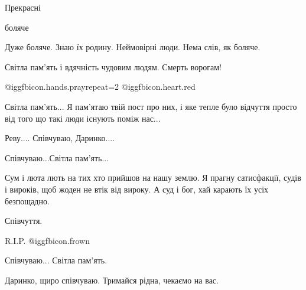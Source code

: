  
 
 
 
 
\zzSecCmt

\begin{itemize} %
Прекрасні

боляче

Дуже боляче. Знаю їх родину. Неймовірні люди. Нема слів, як боляче.

Світла пам'ять і вдячність чудовим людям.
Смерть ворогам!

 @igg{fbicon.hands.pray}{repeat=2} @igg{fbicon.heart.red}

Світла пам'ять...
Я пам'ятаю твій пост про них, і яке тепле було відчуття просто від того що такі люди існують поміж нас...

Реву....
Співчуваю, Даринко....

Співчуваю...Світла пам'ять...


Сум і люта лють на тих хто прийшов на нашу землю. Я прагну сатисфакції, судів і
вироків, щоб жоден не втік від вироку. А суд і бог, хай карають їх усіх
безпощадно.

Співчуття.

R.I.P.  @igg{fbicon.frown} 

Співчуваю... Світла пам'ять.

Даринко, щиро співчуваю. Тримайся рідна, чекаємо на вас.

\end{itemize} %
